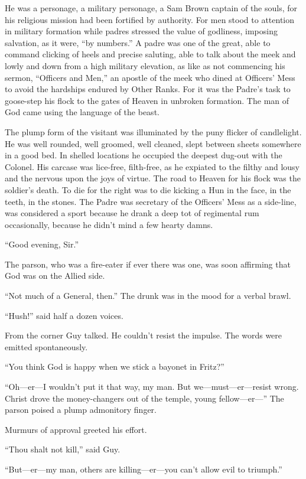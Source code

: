 He was a personage, a military personage, a Sam Brown captain of the souls, for his religious mission had been fortified by authority. For men stood to attention in military formation while padres stressed the value of godliness, imposing salvation, as it were, ``by numbers.'' A padre was one of the great, able to command clicking of heels and precise saluting, able to talk about the meek and lowly and down from a high military elevation, as like as not commencing his sermon, ``Officers and Men,'' an apostle of the meek who dined at Officers' Mess to avoid the hardships endured by Other Ranks. For it was the Padre's task to goose-step his flock to the gates of Heaven in unbroken formation. The man of God came using the language of the beast.

The plump form of the visitant was illuminated by the puny flicker of candlelight. He was well rounded, well groomed, well cleaned, slept between sheets somewhere in a good bed. In shelled locations he occupied the deepest dug-out with the Colonel. His carcase was lice-free, filth-free, as he expiated to the filthy and lousy and the nervous upon the joys of virtue. The road to Heaven for his flock was the soldier's death. To die for the right was to die kicking a Hun in the face, in the teeth, in the stones. The Padre was secretary of the Officers' Mess as a side-line, was considered a sport because he drank a deep tot of regimental rum occasionally, because he didn't mind a few hearty damns.

``Good evening, Sir.''

The parson, who was a fire-eater if ever there was one, was soon affirming that God was on the Allied side.

``Not much of a General, then.'' The drunk was in the mood for a verbal brawl.

``Hush!'' said half a dozen voices.

From the corner Guy talked. He couldn't resist the impulse. The words were emitted spontaneously.

``You think God is happy when we stick a bayonet in Fritz?''

``Oh---er---I wouldn't put it that way, my man. But we---must---er---resist wrong. Christ drove the money-changers out of the temple, young fellow---er---'' The parson poised a plump admonitory finger.

Murmurs of approval greeted his effort.

``Thou shalt not kill,'' said Guy.

``But---er---my man, others are killing---er---you can't allow evil to triumph.''

